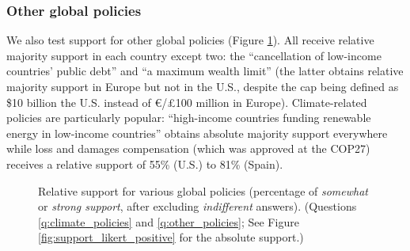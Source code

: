\subsubsection{Other global policies} %
We also test support for other %
global policies (Figure \ref{fig:support}). All receive relative majority support in each country except two:  the ``cancellation of low-income countries' public debt'' and ``a maximum wealth limit'' (the latter obtains relative majority support in Europe but not in the U.S., despite the cap being defined as \$10 billion the U.S. instead of \euro{}/£100 million in Europe). Climate-related policies are particularly popular: ``high-income countries funding renewable energy in low-income countries'' obtains absolute majority support everywhere while loss and damages compensation (which was approved at the COP27) receives a relative support of 55\% (U.S.) to 81\% (Spain).

\begin{figure}
  \caption[Relative support for various global policies]{Relative support for various global policies (percentage of \textit{somewhat} or \textit{strong support}, after excluding \textit{indifferent} answers). (Questions \ref{q:climate_policies} and \ref{q:other_policies}; See Figure \ref{fig:support_likert_positive} for the absolute support.)%
  } %
  \label{fig:support}
\end{figure} 

